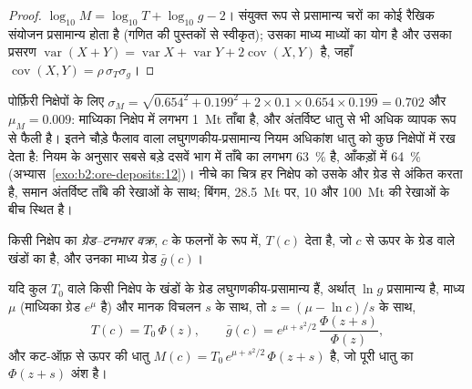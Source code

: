 \begin{proof}
$\log_{10} M = \log_{10} T + \log_{10} g - 2$। संयुक्त रूप से प्रसामान्य चरों का कोई रैखिक संयोजन
प्रसामान्य होता है (गणित की पुस्तकों से स्वीकृत); उसका माध्य माध्यों का योग है और उसका प्रसरण
$\operatorname{var}(X + Y) = \operatorname{var} X + \operatorname{var} Y + 2\operatorname{cov}(X, Y)$ है,
जहाँ $\operatorname{cov}(X, Y) = \rho\,\sigma_T\sigma_g$।
\end{proof}

पोर्फ़िरी निक्षेपों के लिए $\sigma_M = \sqrt{0.654^2 + 0.199^2 + 2 \times 0.1 \times 0.654 \times
0.199} = 0.702$ और $\mu_M = 0.009$: माध्यिका निक्षेप में लगभग \qty{1}{Mt} ताँबा है, और अंतर्विष्ट धातु
 से भी अधिक व्यापक रूप से फैली है। इतने चौड़े फैलाव वाला लघुगणकीय-प्रसामान्य नियम अधिकांश धातु को
कुछ निक्षेपों में रख देता है: नियम के अनुसार सबसे बड़े दसवें भाग में ताँबे का लगभग \qty{63}{\percent} है,
आँकड़ों में \qty{64}{\percent} (अभ्यास~\ref{exo:b2:ore-deposits:12})। नीचे का चित्र हर निक्षेप को उसके
 और ग्रेड से अंकित करता है, समान अंतर्विष्ट ताँबे की रेखाओं के साथ; बिंगम, \qty{28.5}{Mt} पर, 10 और
\qty{100}{Mt} की रेखाओं के बीच स्थित है।

\begin{definition}[ग्रेड--टनभार वक्र]\label{def:b2:ore-deposits:gt}
किसी निक्षेप का \emph{ग्रेड--टनभार वक्र},  $c$ के फलनों के रूप में,
 $T(c)$ देता है, जो $c$ से ऊपर के ग्रेड वाले खंडों का है, और उनका माध्य ग्रेड
$\bar g(c)$।
\end{definition}

\begin{proposition}\label{prop:b2:ore-deposits:gt}
यदि कुल  $T_0$ वाले किसी निक्षेप के खंडों के ग्रेड लघुगणकीय-प्रसामान्य हैं, अर्थात् $\ln g$ प्रसामान्य
है, माध्य $\mu$ (माध्यिका ग्रेड $e^{\mu}$ है) और मानक विचलन $s$ के साथ, तो $z = (\mu -
\ln c)/s$ के साथ,
\begin{equation}
T(c) = T_0\,\Phi(z), \qquad
\bar g(c) = e^{\mu + s^2/2}\,\frac{\Phi(z + s)}{\Phi(z)} ,
\label{eq:b2:ore-deposits:gt}
\end{equation}
और कट-ऑफ़ से ऊपर की धातु $M(c) = T_0\,e^{\mu + s^2/2}\,\Phi(z + s)$ है, जो पूरी धातु का $\Phi(z +
s)$ अंश है।
\end{proposition}

